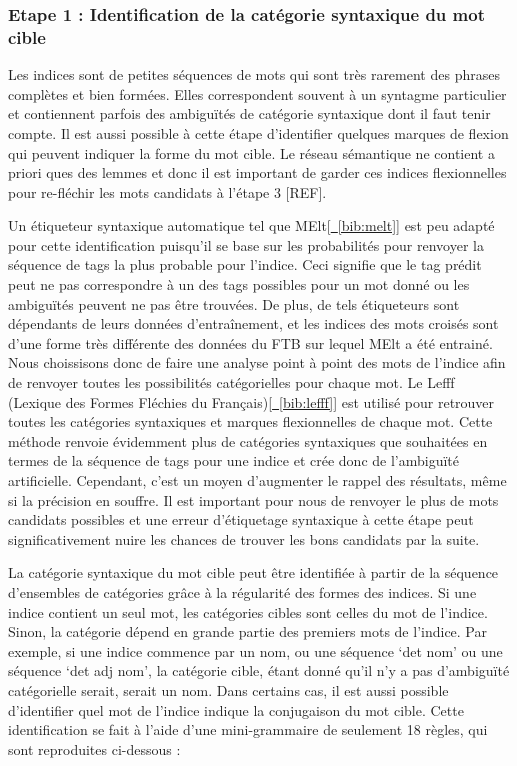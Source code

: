 \subsubsection{Etape 1 : Identification de la catégorie syntaxique du mot cible}
Les indices sont de petites séquences de mots qui sont très rarement des phrases complètes et bien formées. Elles correspondent souvent à un syntagme particulier et contiennent parfois des ambiguïtés de catégorie syntaxique dont il faut tenir compte. Il est aussi possible à cette étape d'identifier quelques marques de flexion qui peuvent indiquer la forme du mot cible. Le réseau sémantique ne contient a priori ques des lemmes et donc il est important de garder ces indices flexionnelles pour re-fléchir les mots candidats à l'étape 3 [REF].  

Un étiqueteur syntaxique automatique tel que MElt[\hyperref[bib:melt]{~\ref*{bib:melt}}] est peu adapté pour cette identification puisqu'il se base sur les probabilités pour renvoyer la séquence de tags la plus probable pour l'indice. Ceci signifie que le tag prédit peut ne pas correspondre à un des tags possibles pour un mot donné ou les ambiguïtés peuvent ne pas être trouvées. De plus, de tels étiqueteurs sont dépendants de leurs données d'entraînement, et les indices des mots croisés sont d'une forme très différente des données du FTB sur lequel MElt a été entrainé. Nous choissisons donc de faire une analyse point à point des mots de l'indice afin de renvoyer toutes les possibilités catégorielles pour chaque mot. Le Lefff (Lexique des Formes Fléchies du Français)[\hyperref[bib:lefff]{~\ref*{bib:lefff}}] est utilisé pour retrouver toutes les catégories syntaxiques et marques flexionnelles de chaque mot. Cette méthode renvoie évidemment plus de catégories syntaxiques que souhaitées en termes de la séquence de tags pour une indice et crée donc de l'ambiguïté artificielle. Cependant, c'est un moyen d'augmenter le rappel des résultats, même si la précision en souffre. Il est important pour nous de renvoyer le plus de mots candidats possibles et une erreur d'étiquetage syntaxique à cette étape peut significativement nuire les chances de trouver les bons candidats par la suite.

La catégorie syntaxique du mot cible peut être identifiée à partir de la séquence d'ensembles de catégories grâce à la régularité des formes des indices. Si une indice contient un seul mot, les catégories cibles sont celles du mot de l'indice. Sinon, la catégorie dépend en grande partie des premiers mots de l'indice. Par exemple, si une indice commence par un nom, ou une séquence \lq{det nom}\rq{} ou une séquence \lq{det adj nom}\rq{}, la catégorie cible, étant donné qu'il n'y a pas d'ambiguïté catégorielle serait, serait un nom. Dans certains cas, il est aussi possible d'identifier quel mot de l'indice indique la conjugaison du mot cible. Cette identification se fait à l'aide d'une mini-grammaire de seulement 18 règles, qui sont reproduites ci-dessous :

